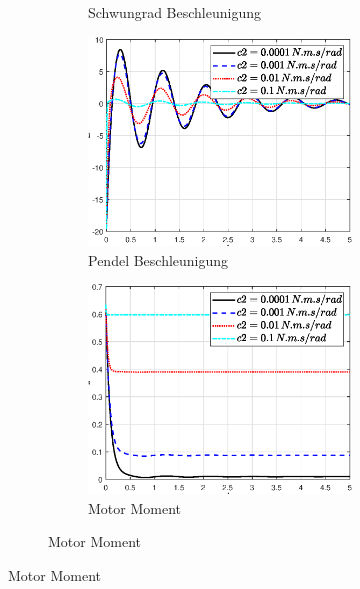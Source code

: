 \begin{figure}
\begin{figure}
\begin{subfigure}[b]{0.49 \linewidth}
        \caption{Schwungrad Beschleunigung}
        \label{fig:c2_phi_punkt_punkt}
    \end{subfigure}
    \begin{subfigure}[b]{0.49 \linewidth}
        \includegraphics[width=\linewidth]{Bilder/5_sensi/fig/c2/theta_punkt_punkt.eps}
        \caption{Pendel Beschleunigung}
        \label{fig:c2_theta_punkt_punkt}
    \end{subfigure}
    \begin{subfigure}[b]{0.49\linewidth}
        \includegraphics[width=\linewidth]{Bilder/5_sensi/fig/c2/tau.eps}
        \caption{Motor Moment}

\end{subfigure}
\end{figure}
\end{figure}
